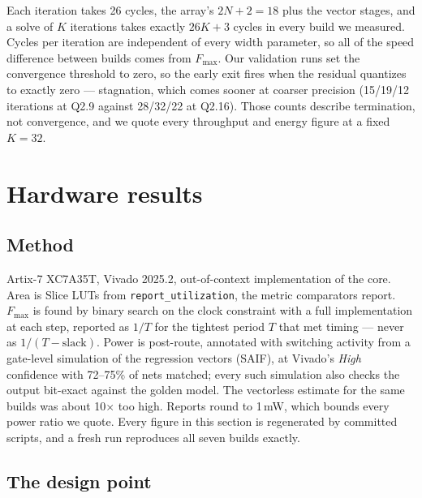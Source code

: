\documentclass[conference]{IEEEtran}
\begin{document}
Each iteration takes 26 cycles, the array's $2N+2=18$ plus the vector
stages, and a solve of $K$ iterations takes exactly $26K+3$ cycles in every
build we measured. Cycles per iteration are independent of every width
parameter, so all of the speed difference between builds comes from
$F_{\max}$. Our validation runs set the convergence threshold to zero, so the
early exit fires when the residual quantizes to exactly zero --- stagnation,
which comes sooner at coarser precision (15/19/12 iterations at Q2.9 against
28/32/22 at Q2.16). Those counts describe termination, not convergence, and we
quote every throughput and energy figure at a fixed $K=32$.

\section{Hardware results}
\label{sec:hw}

\subsection{Method}

Artix-7 XC7A35T, Vivado 2025.2, out-of-context implementation of the core. Area
is Slice LUTs from \texttt{report\_utilization}, the metric comparators
report. $F_{\max}$ is found by binary search on the clock constraint with a
full implementation at each step, reported as $1/T$ for the tightest period
$T$ that met timing --- never as $1/(T-\text{slack})$. Power is post-route,
annotated with switching activity from a gate-level simulation of the
regression vectors (SAIF), at Vivado's \emph{High} confidence with 72--75\% of
nets matched; every such simulation also checks the output bit-exact against
the golden model. The vectorless estimate for the same builds was about
10$\times$ too high. Reports round to 1\,mW, which bounds every power ratio we
quote. Every figure in this section is regenerated by committed scripts, and a
fresh run reproduces all seven builds exactly.

\subsection{The design point}
\end{document}
